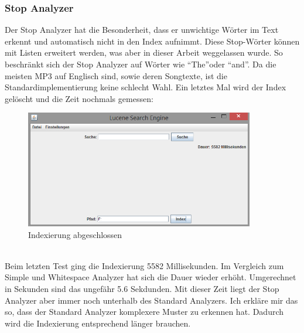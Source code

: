 \documentclass[12pt,a4paper,ngerman]{report}
\begin{document}
\subsubsection*{Stop Analyzer}
Der Stop Analyzer hat die Besonderheit, dass er unwichtige Wörter im Text erkennt und automatisch nicht in den Index aufnimmt. Diese Stop-Wörter können mit Listen erweitert werden, was aber in dieser Arbeit weggelassen wurde. So beschränkt sich der Stop Analyzer auf Wörter wie \textquotedblleft The\textquotedblright oder \textquotedblleft and\textquotedblright . Da die meisten MP3 auf Englisch sind, sowie deren Songtexte, ist die Standardimplementierung keine schlecht Wahl.
\newpage
Ein letztes Mal wird der Index gelöscht und die Zeit nochmals gemessen:
\begin{figure}[h!]
\centering
\includegraphics[width=10cm]{img/stop-analyzer-index.png}
\caption{Indexierung abgeschlossen\protect\footnotemark}
\end{figure}
\\
Beim letzten Test ging die Indexierung 5582 Millisekunden. Im Vergleich zum Simple und Whitespace Analyzer hat sich die Dauer wieder erhöht. Umgerechnet in Sekunden sind das ungefähr 5.6 Sekdunden. Mit dieser Zeit liegt der Stop Analyzer aber immer noch unterhalb des Standard Analyzers. Ich erkläre mir das so, dass der Standard Analyzer komplexere Muster zu erkennen hat. Dadurch wird die Indexierung entsprechend länger brauchen.
\end{document}
